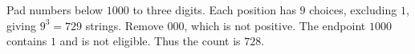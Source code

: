 Pad numbers below $1000$ to three digits. Each position has $9$ choices, excluding $1$, giving $9^3=729$ strings. Remove $000$, which is not positive. The endpoint $1000$ contains $1$ and is not eligible. Thus the count is $\boxed{728}$.
